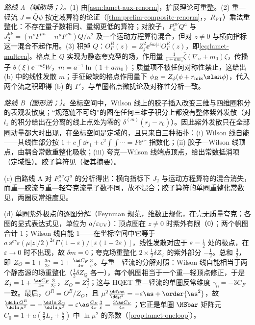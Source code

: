 \begin{proofsketch}
\emph{路线 A（辅助场；\cite{Ji:2017oey,Green:2017xeu}）。}(1) 由\cref{asm:lamet-aux-renorm}，扩展理论可重整。(2) 重—轻流 $J=\bar Q\psi$ 按定域算符的论证（\cref{thm:prelim-composite-renorm}，\tagR，$R_{\mathrm{PT}}$）乘法重整化：不存在量子数相同、量纲更低的算符；对胶子，$F^{\mu\nu}_aQ^a$ 与 $J_2^{\mu\nu}=(n^\nu F^{\mu n}-n^\mu F^{\nu n})Q/n^2$ 及一个运动方程算符混合\cite{Dorn:1986dt}，但对 $z\neq0$ 与横向指标这一混合不起作用。(3) 积掉 $Q$：$O^B_\Gamma(z)=Z_j^2\ee^{\delta m|z|}O^R_\Gamma(z)$，即\cref{eq:lamet-multren}。格点上 $Q$ 实现为静态夸克型的场，作用量 $\frac1{1+am_0}\bar\zeta(\nabla_n+m_0)\zeta$，传播子 $\theta(\xi)\ee^{-m\xi}W$，$m=a^{-1}\ln(1+am_0)$；质量项不被任何对称性禁止\cite{Green:2017xeu}，这给出 (b) 中的线性发散 $m$；手征破缺的格点作用量下 $\phi_R=Z_\phi(\phi+r_{\rm mix}\sla n\phi)$，代入两个流之积即得 (b) 的 $\Gamma'$\cite{Green:2017xeu}，与单圈格点微扰论\cite{Constantinou:2017sej}及对称性分析\cite{Chen:2017mie}一致。

\emph{路线 B（图形法；\cite{Ishikawa:2017faj}）。}坐标空间中，Wilson 线上的胶子插入改变三维与四维圈积分的表观发散度；“规范链不可约”的图在任何三维子积分上都没有整体紫外发散（对 $l_z$ 的积分给出在分离的线上点处为零的 $\delta^{(m)}(r_j-r_0)$）。因此紫外发散只在全部圈动量都大时出现，在坐标空间是定域的，且只来自三种拓扑：(i) Wilson 线自能——其线性部分按 $1+c\int\dd r_1+c^2\int\!\!\int\cdots=P\ee^{cr}$ 指数化；(ii) 胶子—Wilson 线顶点，由耦合常数重整化吸收\cite{Dotsenko:1979wb}；(iii) 夸克—Wilson 线端点顶点，给出常数抵消项（定域性）。胶子算符见\cite{Li:2018tpe,Zhang:2018diq}（据其摘要）。

(c) 由路线 A 对 $F^{\mu\nu}_aQ^a$ 的分析得出：横向指标下 $J_2$ 与运动方程算符的混合消失，而重—胶流与重—轻夸克流量子数不同，故不混合\cite{JiEtAl2021,Zhang:2018diq}；胶子算符的单圈重整化常数见\cite{JiEtAl2021}，两圈反常维度见\cite{Braun:2020ymy}。

(d) 单圈紫外极点的逐图分解（Feynman 规范，维数正规化，在壳无质量夸克；各图的显式表达式见\cite[第~III~节]{IzubuchiEtAl2018}，单位为 $a/\varepsilon_{\rm UV}$）：顶点图在 $z\neq0$ 时紫外有限（$0$）；两个帆图合计 $1$；Wilson 线自能 $1$——在坐标空间中它等于 $a\,\ee^{\varepsilon\gamma_E}(\mu|z|/2)^{2\varepsilon}\Gamma(1-\varepsilon)/[\varepsilon(1-2\varepsilon)]$，线性发散对应于 $\varepsilon=\frac12$ 处的极点，在 $\varepsilon\to0$ 时不出现，故 $\delta m=0$；夸克场重整化 $2\times\frac12\delta Z_\psi$ 的紫外部分 $-\frac12$。总和 $\frac32$，即 $Z_O=1+\frac{3a}{2\varepsilon}=1+\frac{\as C_F}{4\pi}\frac3\varepsilon$。与重—轻流的分解对照：Wilson 线自能相当于两个静态源的场重整化（$\frac12\delta Z_Q$ 各一），每个帆图相当于一个重—轻顶点修正，于是 $Z_j=1+\frac{\as C_F}{4\pi}\frac{3}{2\varepsilon}$，$Z_O=Z_j^2$；这与 HQET 重—轻流的单圈反常维度 $\gamma_0=-3C_F$ 一致。最后，$O^R=O^B/Z_O$，且 $\mu^2\frac{\dd\as}{\dd\mu^2}=-\varepsilon\as+\order{\as^2}$，故 $\frac{\dd\ln O^R}{\dd\ln\mu^2}=-\frac{\dd\ln Z_O}{\dd\ln\mu^2}=\varepsilon\as\frac{C_F}{4\pi}\frac3\varepsilon=\frac{3\as C_F}{4\pi}$；它正是单圈 $\MSbar$ 矩阵元 $C_0=1+a(\frac32L_z+\frac52)$ 中 $\ln\mu^2$ 的系数（\cref{prop:lamet-oneloop}）。


\end{proofsketch}
